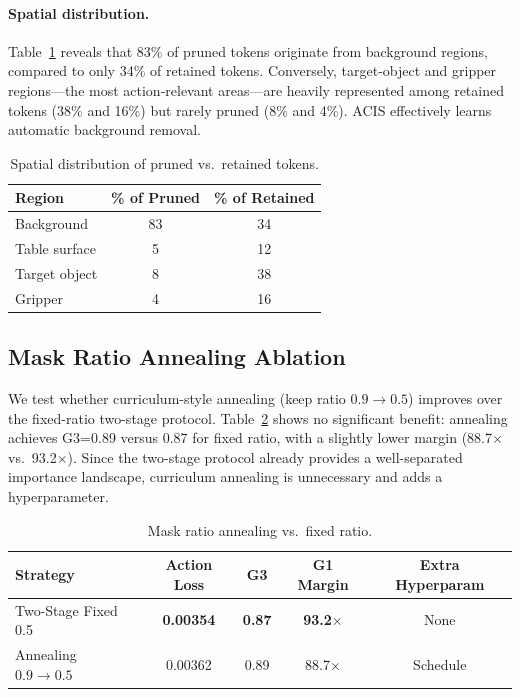 \documentclass[10pt,twocolumn]{article}
\begin{document}
\paragraph{Spatial distribution.}
Table~\ref{tab:spatial} reveals that 83\% of pruned tokens originate from background regions, compared to only 34\% of retained tokens. Conversely, target-object and gripper regions---the most action-relevant areas---are heavily represented among retained tokens (38\% and 16\%) but rarely pruned (8\% and 4\%). ACIS effectively learns automatic background removal.

\begin{table}[t]
\centering
\caption{Spatial distribution of pruned vs.\ retained tokens.}
\label{tab:spatial}
\begin{tabular}{lcc}
\toprule
Region & \% of Pruned & \% of Retained \\
\midrule
Background & 83 & 34 \\
Table surface & 5 & 12 \\
Target object & 8 & 38 \\
Gripper & 4 & 16 \\
\bottomrule
\end{tabular}
\end{table}

\subsection{Mask Ratio Annealing Ablation}
\label{sec:annealing}

We test whether curriculum-style annealing (keep ratio $0.9 \to 0.5$) improves over the fixed-ratio two-stage protocol. Table~\ref{tab:annealing} shows no significant benefit: annealing achieves G3=0.89 versus 0.87 for fixed ratio, with a slightly lower margin (88.7$\times$ vs.\ 93.2$\times$). Since the two-stage protocol already provides a well-separated importance landscape, curriculum annealing is unnecessary and adds a hyperparameter.

\begin{table}[t]
\centering
\caption{Mask ratio annealing vs.\ fixed ratio.}
\label{tab:annealing}
\begin{tabular}{lcccc}
\toprule
Strategy & Action Loss & G3 & G1 Margin & Extra Hyperparam \\
\midrule
Two-Stage Fixed 0.5 & \textbf{0.00354} & \textbf{0.87} & \textbf{93.2$\times$} & None \\
Annealing $0.9 \to 0.5$ & 0.00362 & 0.89 & 88.7$\times$ & Schedule \\
\bottomrule
\end{tabular}
\end{table}
\end{document}
